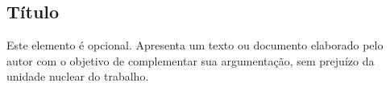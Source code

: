 \documentclass[
        oneside,      %
        english,			
        brazil			 
        ]{abntbibufjf}
\begin{document}
\begin{thebibliography}{99}









\end{thebibliography}



\begin{apendices}

\chapter{\apendseq T\'itulo} 

Este elemento \'e opcional. Apresenta um texto ou documento elaborado pelo autor com o objetivo de complementar sua argumenta\c{c}\~ao, 
sem preju\'izo da unidade nuclear do trabalho.

\end{apendices}
\end{document}
